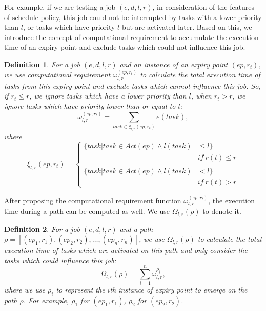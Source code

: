 \documentclass[10pt,conference]{IEEEtran}
\newtheorem{definition}{Definition}
\begin{document}
For example, if we are testing a job $(e,d,l,r)$, in consideration of the features of schedule policy, this job could not be interrupted by tasks with a lower priority than $l$, or tasks which have priority $l$ but are activated later. Based on this, we introduce the concept of computational requirement to accumulate the execution time of an expiry point and exclude tasks which could not influence this job.
\begin{definition}
For a job $(e, d, l, r)$ and an instance of an expiry point $(ep,r_t)$, we use computational requirement $\omega_{l,r}^{(ep,r_t)}$ to calculate the total execution time of tasks from this expiry point and exclude tasks which cannot influence this job. So, if $r_t\leq r$, we ignore tasks which have a lower priority than $l$, when $r_t>r$, we ignore tasks which have priority lower than or equal to $l$:
\begin{equation}
\omega_{l,r}^{(ep,r_t)}=\sum\limits_{task\in \xi_{l,r}(ep,r_t)}e(task),
\end{equation}\label{equation_loweromega}
where 
\[
\xi_{l,r}(ep,r_t)=\begin{cases}\{task|task\in Act(ep)\wedge l(task)&\leq l\}\qquad 
\\&if\ r(t)\leq r\\\\
\{task|task\in Act(ep)\wedge l(task)&<l\}\qquad 
\\&if\ r(t)>r
\end{cases}\]
\end{definition}
After proposing the computational requirement function $\omega_{l,r}^{(ep,r_t)}$, the execution time during a path can be computed as well. We use $\Omega_{l,r}(\rho)$ to denote it.
\begin{definition}
For a job $(e,d,l,r)$ and a path $\rho=[(ep_1,r_1),(ep_2,r_2),\dots,(ep_n,r_n)]$, we use $\Omega_{l,r}(\rho)$ to calculate the total execution time of tasks which are activated on this path and only consider the tasks which could influence this job:
\begin{equation}
\Omega_{l,r}(\rho)=\sum_{i=1}^n\omega_{l,r}^{\rho_i},
\end{equation}\label{equation_higheromega}
where we use $\rho_i$ to represent the $i$th instance of expiry point to emerge on the path $\rho$. For example, $\rho_1$ for $(ep_1,r_1)$, $\rho_2$ for $(ep_2,r_2)$.
\end{definition}
\end{document}
